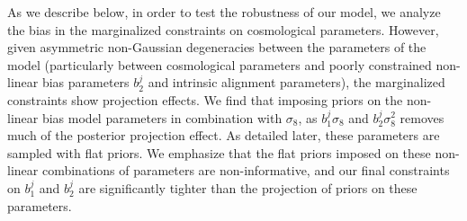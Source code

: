 \documentclass[aps, prd,twocolumn,superscriptaddress,nofootinbib,preprintnumbers]{revtex4-1}
\newcommand{\gammat}{\ensuremath{\gamma_{\rm t}(\theta)}}
\newcommand{\wtheta}{\ensuremath{w(\theta)}}
\newcommand{\SP}[1]{{\color{orange}[SP: #1]}}
\newcommand{\red}[1]{\textcolor{red}{#1}}
\newcommand{\gary}[1]{\textcolor{red}{#1}}
\begin{document}
\begin{enumerate}
    As we describe below, in order to test the robustness of our model, we analyze the bias in the marginalized constraints on cosmological parameters. However, given asymmetric non-Gaussian degeneracies between the parameters of the model (particularly between cosmological parameters and poorly constrained non-linear bias parameters $b^{j}_2$ and intrinsic alignment parameters), the marginalized constraints show projection effects. We find that imposing priors on the non-linear bias model parameters in combination with $\sigma_8$, as $b^{j}_1 \sigma_8$ and $b^{j}_2 \sigma^2_8$ removes much of the posterior projection effect. 
    As detailed later, these parameters are sampled with flat priors. We emphasize that the flat priors imposed on these non-linear combinations of parameters are non-informative, and our final constraints on $b^{j}_1$ and $b^{j}_2$ are significantly tighter than the projection of priors on these parameters.
\end{enumerate}
\end{document}
